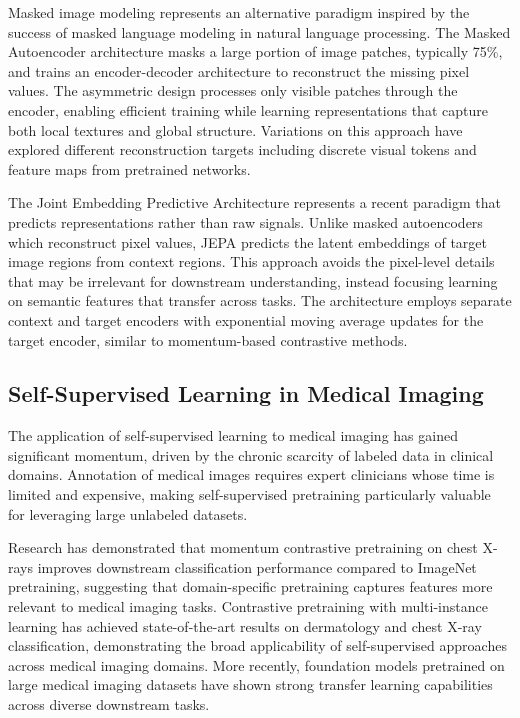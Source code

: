 \documentclass[11pt,a4paper]{article}
\begin{document}
Masked image modeling represents an alternative paradigm inspired by the success of masked language modeling in natural language processing. The Masked Autoencoder architecture masks a large portion of image patches, typically 75\%, and trains an encoder-decoder architecture to reconstruct the missing pixel values. The asymmetric design processes only visible patches through the encoder, enabling efficient training while learning representations that capture both local textures and global structure. Variations on this approach have explored different reconstruction targets including discrete visual tokens and feature maps from pretrained networks.

The Joint Embedding Predictive Architecture represents a recent paradigm that predicts representations rather than raw signals. Unlike masked autoencoders which reconstruct pixel values, JEPA predicts the latent embeddings of target image regions from context regions. This approach avoids the pixel-level details that may be irrelevant for downstream understanding, instead focusing learning on semantic features that transfer across tasks. The architecture employs separate context and target encoders with exponential moving average updates for the target encoder, similar to momentum-based contrastive methods.

\subsection{Self-Supervised Learning in Medical Imaging}

The application of self-supervised learning to medical imaging has gained significant momentum, driven by the chronic scarcity of labeled data in clinical domains. Annotation of medical images requires expert clinicians whose time is limited and expensive, making self-supervised pretraining particularly valuable for leveraging large unlabeled datasets.

Research has demonstrated that momentum contrastive pretraining on chest X-rays improves downstream classification performance compared to ImageNet pretraining, suggesting that domain-specific pretraining captures features more relevant to medical imaging tasks. Contrastive pretraining with multi-instance learning has achieved state-of-the-art results on dermatology and chest X-ray classification, demonstrating the broad applicability of self-supervised approaches across medical imaging domains. More recently, foundation models pretrained on large medical imaging datasets have shown strong transfer learning capabilities across diverse downstream tasks.
\end{document}
